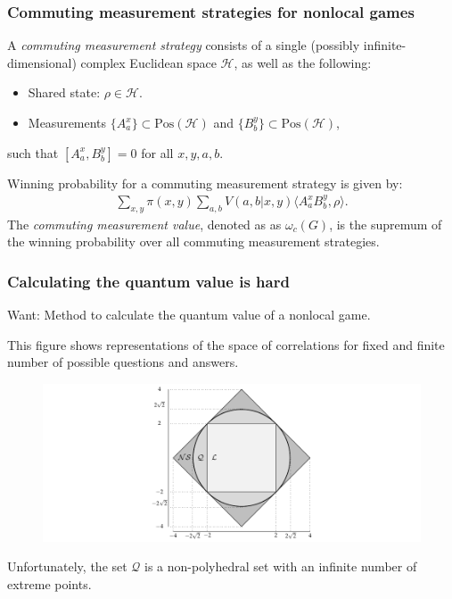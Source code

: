 \documentclass{beamer}
\newcommand{\bigip}[2]{\bigl\langle #1, #2 \bigr\rangle}
\def\H{\mathcal{H}}
\def\Q{\mathcal{Q}}
\newcommand{\setft}[1]{\mathrm{#1}}
\newcommand{\Pos}{\setft{Pos}}
\begin{document}
\begin{frame}
	\frametitle{Commuting measurement strategies for nonlocal games}
	A \emph{commuting measurement strategy} consists of a single (possibly infinite-dimensional) complex Euclidean space $\H$, as well as the following:
	\begin{itemize}
		\item Shared state: $\rho \in \H$.
		\item Measurements $\{A^x_a\} \subset \Pos(\H)$ and $\{B_b^y\} \subset \Pos(\H)$,
	\end{itemize}
	such that $\left[A_a^x, B_b^y\right] = 0$ for all $x,y,a,b$. 
	\vspace{5mm}
	
	Winning probability for a commuting measurement strategy is given by:
	\begin{align*}
		\sum_{x,y} \pi(x,y) \sum_{a,b} V(a,b|x,y) \bigip{A_a^x B_b^y}{\rho}.
	\end{align*}
	The \emph{commuting measurement value}, denoted as as $\omega_c(G)$, is the supremum of the winning probability over all commuting measurement strategies. 
\end{frame}

\begin{frame}
	\frametitle{Calculating the quantum value is hard}
	\begin{center}
		{Want: Method to calculate the quantum value of a nonlocal game.}
	\end{center}	
	\vspace{2mm}
	This figure shows representations of the space of correlations for fixed and finite number of possible questions and answers.
	\begin{figure}[!htpb] \label{fig:extended-nonlocal-game}
	\begin{center}
		\includegraphics[scale=0.65]{figures/chsh_polytope.pdf}
	\end{center}
\end{figure}	
	Unfortunately, the set $\Q$ is a non-polyhedral set with an infinite number of extreme points. 
\end{frame}
\end{document}
